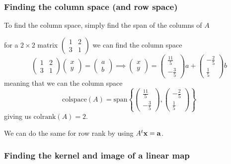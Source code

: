 \documentclass[10pt, a4paper]{article}
\begin{document}
\subsubsection{Finding the column space
(and row space)}

To find the column space,
simply find the span of the columns of $A$
\begin{example}
    for a $2 \times 2$ matrix $\begin{pmatrix}
        1 & 2 \\ 3 & 1
    \end{pmatrix}$ we can find the column space
    \[
    \begin{pmatrix}
        1 & 2 \\ 3 & 1
    \end{pmatrix}\begin{pmatrix}
        x \\ y
    \end{pmatrix} = \begin{pmatrix}
        a \\ b
    \end{pmatrix} \implies \begin{pmatrix}
        x \\ y
    \end{pmatrix} = \begin{pmatrix}
        \frac{11}{5} \\ -\frac{3}{5}
    \end{pmatrix}a + \begin{pmatrix}
        -\frac{2}{5} \\ \frac{1}{5}
    \end{pmatrix}b
    \]
    meaning that we can the column space
    \[
    \mathrm{colspace}(A) = \mathrm{span}\left\{\begin{pmatrix}
        \frac{11}{5} \\ -\frac{3}{5}
    \end{pmatrix}, \begin{pmatrix}
        -\frac{2}{5} \\ \frac{1}{5}
    \end{pmatrix}\right\}
    \]
    giving us $\mathrm{colrank}(A) = 2$.
\end{example}

We can do the same for row rank by using $A ^ t\mathbf{x} = \mathbf{a}$.

\subsubsection{Finding the kernel and image of a linear map}
\end{document}
